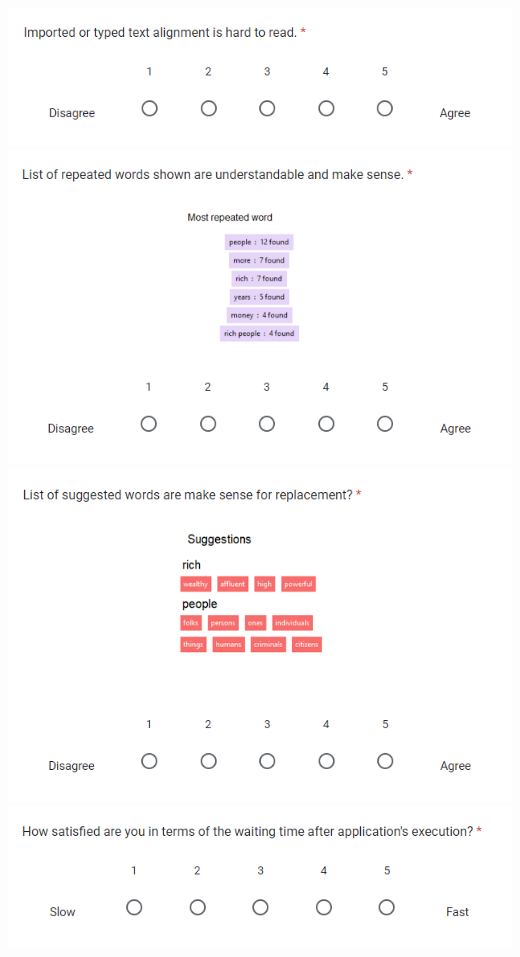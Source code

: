 \documentclass[12pt,oneside,openright,a4paper]{cpe-english-project}
\begin{document}
\includegraphics[width=15cm]{./img/Appendix/Survey-2-2.png}
\includegraphics[width=15cm]{./img/Appendix/Survey-2-3.png}
\includegraphics[width=15cm]{./img/Appendix/Survey-2-4.png}
\includegraphics[width=15cm]{./img/Appendix/Survey-2-5.png}
\end{document}

